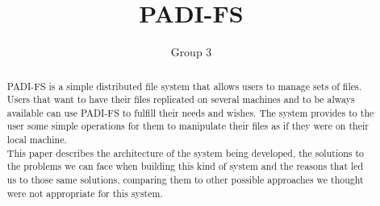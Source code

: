 \documentclass[times, 10pt,twocolumn]{article}
\begin{document}
\title{PADI-FS}

\author{Group 3
}

\maketitle
\thispagestyle{empty}

\begin{abstract}
   PADI-FS is a simple distributed file system that allows users to manage
   sets of files. Users that want to have their files replicated on several
   machines and to be always available can use PADI-FS to fulfill their
   needs and wishes. The system provides to the user some simple operations
   for them to manipulate their files as if they were on their local machine.\\

   This paper describes the architecture of the system being developed, the
   solutions to the problems we can face when building this kind of system
   and the reasons that led us to those same solutions, comparing them to
   other possible approaches we thought were not appropriate for this system.
\end{abstract}










\end{document}
